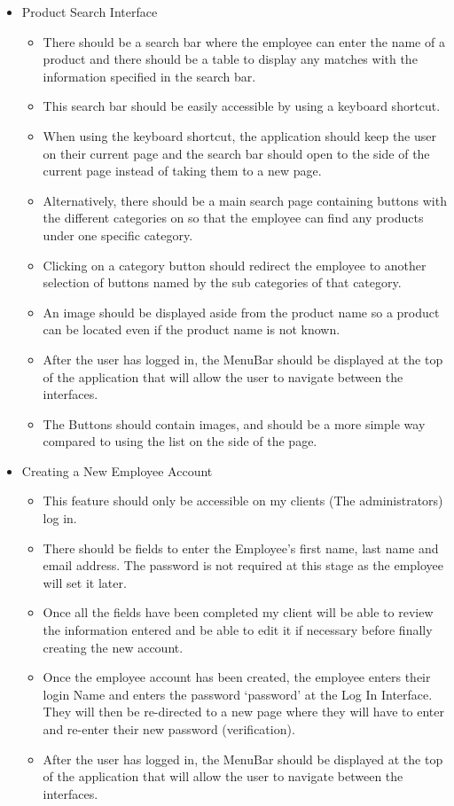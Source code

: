 \begin{itemize}
	\item Product Search Interface
	\begin{itemize}
		\item There should be a search bar where the employee can enter the name of a product and there should be a table to display any matches with the information specified in the search bar.
		\item This search bar should be easily accessible by using a keyboard shortcut.
		\item When using the keyboard shortcut, the application should keep the user on their current page and the search bar should open to the side of the current page instead of taking them to a new page.
		\item Alternatively, there should be a main search page containing buttons with the different categories on so that the employee can find any products under one specific category.
		\item Clicking on a category button should redirect the employee to another selection of buttons named by the sub categories of that category.
		\item An image should be displayed aside from the product name so a product can be located even if the product name is not known.
		\item After the user has logged in, the MenuBar should be displayed at the top of the application that will allow the user to navigate between the interfaces.
		\item The Buttons should contain images, and should be a more simple way compared to using the list on the side of the page.
	\end{itemize}

	\item Creating a New Employee Account
	\begin{itemize}
		\item This feature should only be accessible on my clients (The administrators) log in.
		\item There should be fields to enter the Employee's first name, last name and email address. The password is not required at this stage as the employee will set it later.
		\item Once all the fields have been completed my client will be able to review the information entered and be able to edit it if necessary before finally creating the new account.
		\item Once the employee account has been created, the employee enters their login Name and enters the password ‘password’ at the Log In Interface. They will then be re-directed to a new page where they will have to enter and re-enter their new password (verification). 
		\item After the user has logged in, the MenuBar should be displayed at the top of the application that will allow the user to navigate between the interfaces.
	\end{itemize}


\end{itemize}
